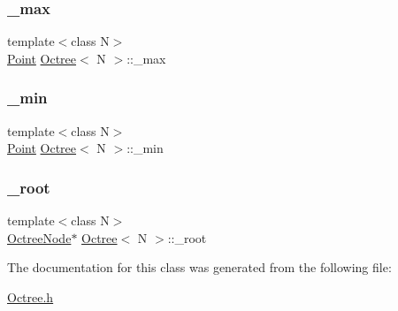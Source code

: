 \mbox{\label{classOctree_a58bcb3926893c3c8d463e05859fd600c}} 
\subsubsection{\texorpdfstring{\+\_\+max}{\_max}}
{\footnotesize\ttfamily template$<$class N$>$ \\
\hyperlink{structOctree_1_1Point}{Point} \hyperlink{classOctree}{Octree}$<$ N $>$\+::\+\_\+max\hspace{0.3cm}{\ttfamily [protected]}}

\mbox{\label{classOctree_ab47cc9e63705799270956fc6f769c277}} 
\subsubsection{\texorpdfstring{\+\_\+min}{\_min}}
{\footnotesize\ttfamily template$<$class N$>$ \\
\hyperlink{structOctree_1_1Point}{Point} \hyperlink{classOctree}{Octree}$<$ N $>$\+::\+\_\+min\hspace{0.3cm}{\ttfamily [protected]}}

\mbox{\label{classOctree_a1825458b3af1769fc9ce7021b8438574}} 
\subsubsection{\texorpdfstring{\+\_\+root}{\_root}}
{\footnotesize\ttfamily template$<$class N$>$ \\
\hyperlink{structOctree_1_1OctreeNode}{Octree\+Node}$\ast$ \hyperlink{classOctree}{Octree}$<$ N $>$\+::\+\_\+root\hspace{0.3cm}{\ttfamily [protected]}}



The documentation for this class was generated from the following file\+:\begin{DoxyCompactItemize}
\item 
\hyperlink{Octree_8h}{Octree.\+h}\end{DoxyCompactItemize}
